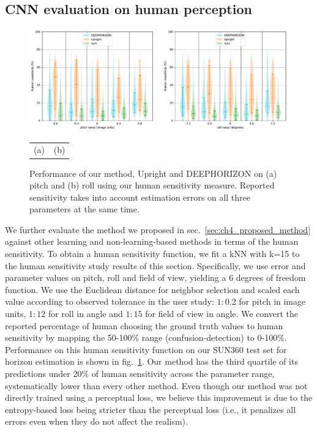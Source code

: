 \subsection{CNN evaluation on human perception}
\label{sec:cnn-evaluation-perception}

\begin{figure}
\centering
\includegraphics[width=\linewidth]{figures/method/human_sensitivity_performance_SUN360.pdf}
\begin{tabular}{p{0.5\linewidth}p{0.5\linewidth}}
\hspace{1.5cm}(a) & \hspace{1.3cm}(b)
\end{tabular}
\caption[Performance on human sensitivity measure]{Performance of our method, Upright and DEEPHORIZON on (a) pitch and (b) roll using our human sensitivity measure. Reported sensitivity takes into account estimation errors on all three parameters at the same time.}
\label{fig:method_human_performance}
\end{figure}


We further evaluate the method we proposed in sec.~\ref{sec:ch4_proposed_method} against other learning and non-learning-based methods in terms of the human sensitivity. To obtain a human sensitivity function, we fit a kNN with k=15 to the human sensitivity study results of this section. Specifically, we use error and parameter values on pitch, roll and field of view, yielding a 6 degrees of freedom function. We use the Euclidean distance for neighbor selection and scaled each value according to observed tolerance in the user study: $1{:}0.2$ for pitch in image units, $1{:}12$ for roll in angle and $1{:}15$ for field of view in angle. We convert the reported percentage of human choosing the ground truth values to human sensitivity by mapping the 50-100\% range (confusion-detection) to 0-100\%. Performance on this human sensitivity function on our SUN360 test set for horizon estimation is shown in fig.~\ref{fig:method_human_performance}. Our method has the third quartile of its predictions under 20\% of human sensitivity across the parameter range, systematically lower than every other method. Even though our method was not directly trained using a perceptual loss, we believe this improvement is due to the entropy-based loss being stricter than the perceptual loss (i.e., it penalizes all errors even when they do not affect the realism).

